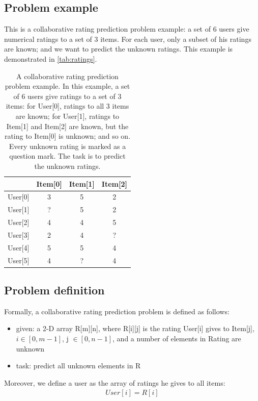\documentclass[twocolumn]{article}
\begin{document}
\subsection{Problem example}
This is a collaborative rating prediction problem example: 
a set of 6 users give numerical ratings to a set of 3 items.
For each user, only a subset of his ratings are known; 
and we want to predict the unknown ratings.
This example is demonstrated in \autoref{tab:ratings}.
\begin{table}[h]
	\centering
	\caption{A collaborative rating prediction problem example.
		In this example, a set of 6 users give ratings to a set of 3 items: 
		for User[0], ratings to all 3 items are known; 
		for User[1], ratings to Item[1] and Item[2] are known, 
		but the rating to Item[0] is unknown; and so on.
		Every unknown rating is marked as a question mark.
		The task is to predict the unknown ratings.
	}
	\begin{tabularx}{0.5\textwidth}{ |X|c|c|c|}  \hline \rowcolor{blue!50}
		& Item[0] & Item[1] & Item[2] \\ \hline
		User[0] & 3 & 5 & 2 \\ \hline
		User[1] & ? & 5 & 2 \\ \hline
		User[2] & 4 & 4 & 5 \\ \hline
		User[3] & 2 & 4 & ? \\ \hline
		User[4] & 5 & 5 & 4 \\ \hline
		User[5] & 4 & ? & 4 \\ \hline
	\end{tabularx}
	\label{tab:ratings}
\end{table}

\subsection{Problem definition}
Formally, a collaborative rating prediction problem is defined as follows:
\begin{itemize}
	\item given: a 2-D array R[m][n], 
	where R[i][j] is the rating User[i] gives to Item[j],
	$ i \in [0, m-1] $, j $ \in [0, n-1] $, and a number of elements in Rating 
	are unknown
	\item task: predict all unknown elements in R
\end{itemize}
Moreover, we define a user as the array of ratings he gives to all items:
\begin{align*}
	User[i] = R[i]
\end{align*}
\end{document}
